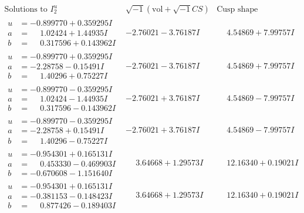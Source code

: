 \documentclass[1p]{elsarticle_modified}
\theoremstyle{definition}
\newcommand{\I}{\sqrt{-1}}
\begin{document}
$$\begin{array}{c|c|c}  
\text{Solutions to }I^u_{2}& \I (\text{vol} + \sqrt{-1}CS) & \text{Cusp shape}\\
 \hline 
\begin{aligned}
u &= -0.899770 + 0.359295 I \\
a &= \phantom{-}1.02424 + 1.44935 I \\
b &= \phantom{-}0.317596 + 0.143962 I\end{aligned}
 & -2.76021 - 3.76187 I & \phantom{-}4.54869 + 7.99757 I \\ \hline\begin{aligned}
u &= -0.899770 + 0.359295 I \\
a &= -2.28758 - 0.15491 I \\
b &= \phantom{-}1.40296 + 0.75227 I\end{aligned}
 & -2.76021 - 3.76187 I & \phantom{-}4.54869 + 7.99757 I \\ \hline\begin{aligned}
u &= -0.899770 - 0.359295 I \\
a &= \phantom{-}1.02424 - 1.44935 I \\
b &= \phantom{-}0.317596 - 0.143962 I\end{aligned}
 & -2.76021 + 3.76187 I & \phantom{-}4.54869 - 7.99757 I \\ \hline\begin{aligned}
u &= -0.899770 - 0.359295 I \\
a &= -2.28758 + 0.15491 I \\
b &= \phantom{-}1.40296 - 0.75227 I\end{aligned}
 & -2.76021 + 3.76187 I & \phantom{-}4.54869 - 7.99757 I \\ \hline\begin{aligned}
u &= -0.954301 + 0.165131 I \\
a &= \phantom{-}0.453330 - 0.469903 I \\
b &= -0.670608 - 1.151640 I\end{aligned}
 & \phantom{-}3.64668 + 1.29573 I & \phantom{-}12.16340 + 0.19021 I \\ \hline\begin{aligned}
u &= -0.954301 + 0.165131 I \\
a &= -0.381153 - 0.148423 I \\
b &= \phantom{-}0.877426 - 0.189403 I\end{aligned}
 & \phantom{-}3.64668 + 1.29573 I & \phantom{-}12.16340 + 0.19021 I \\ \hline\begin{aligned}

\end{aligned}
\end{array}$$
\end{document}
